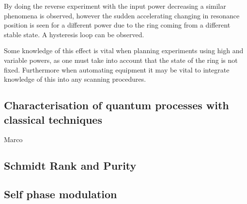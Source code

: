 By doing the reverse experiment with the input power decreasing a similar phenomena is observed, however the sudden accelerating changing in resonance position is seen for a different power due to the ring coming from a different stable state. A hysteresis loop can be observed.

Some knowledge of this effect is vital when planning experiments using high and variable powers, as one must take into account that the state of the ring is not fixed. Furthermore when automating equipment it may be vital to integrate knowledge of this into any scanning procedures. 

\subsection{Characterisation of quantum processes with classical techniques}
Marco \cite{helt_spontaneous_2010}

\subsection{Schmidt Rank and Purity}

\subsection{Self phase modulation}
